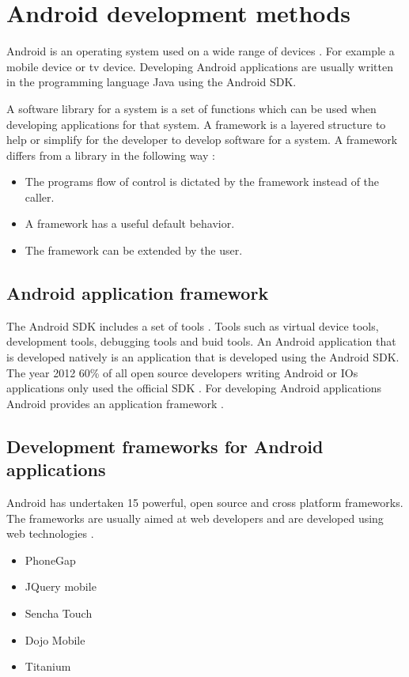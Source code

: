 \section{Android development methods}\label{section-android-development-methods}
Android is an operating system used on a wide range of devices \cite{dell2011}. For example a mobile device or tv device. Developing Android applications are usually written in the programming language Java using the Android SDK.

A software library for a system is a set of functions which can be used when developing applications for that system. A framework is a layered structure to help or simplify for the developer to develop software for a system. A framework differs from a library in the following way \cite{riehle2000}:

\begin{itemize}
\item The programs flow of control is dictated by the framework instead of the caller.
\item A framework has a useful default behavior.
\item The framework can be extended by the user.
\end{itemize}

\subsection{Android application framework} 
The Android SDK includes a set of tools \cite{sdk2015}. Tools such as virtual device tools, development tools, debugging tools and buid tools. An Android application that is developed natively is an application that is developed using the Android SDK. The year 2012 60\% of all open source developers writing Android or IOs applications only used the official SDK \cite{eclipse2012}. For developing Android applications Android provides an application framework \cite{android-framework2015}.

\subsection{Development frameworks for Android applications}
Android has undertaken 15 powerful, open source and cross platform frameworks. The frameworks are usually aimed at web developers and are developed using web technologies \cite{mondal2013}. 

\begin{itemize}
\item PhoneGap
\item JQuery mobile
\item Sencha Touch
\item Dojo Mobile
\item Titanium
\end{itemize}

